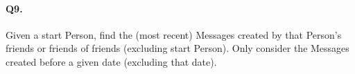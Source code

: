 \paragraph{Q9.}
Given a start Person, find the (most recent) Messages created by that
Person's friends or friends of friends (excluding start Person). Only
consider the Messages created before a given date (excluding that date).
